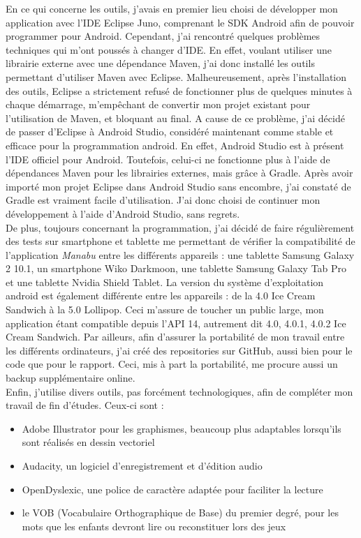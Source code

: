 En ce qui concerne les outils, j'avais en premier lieu choisi de développer mon application avec l'IDE Eclipse Juno, comprenant le SDK Android afin de pouvoir programmer pour Android. Cependant, j'ai rencontré quelques problèmes techniques qui m'ont poussés à changer d'IDE. En effet, voulant utiliser une librairie externe avec une dépendance Maven, j'ai donc installé les outils permettant d'utiliser Maven avec Eclipse. Malheureusement, après l'installation des outils, Eclipse a strictement refusé de fonctionner plus de quelques minutes à chaque démarrage, m'empêchant de convertir mon projet existant pour l'utilisation de Maven, et bloquant au final. A cause de ce problème, j'ai décidé de passer d'Eclipse à Android Studio, considéré maintenant comme stable et efficace pour la programmation android. En effet, Android Studio est à présent l'IDE officiel pour Android. Toutefois, celui-ci ne fonctionne plus à l'aide de dépendances Maven pour les librairies externes, mais grâce à Gradle. Après avoir importé mon projet Eclipse dans Android Studio sans encombre, j'ai constaté de Gradle est vraiment facile d'utilisation. J'ai donc choisi de continuer mon développement à l'aide d'Android Studio, sans regrets.\\

De plus, toujours concernant la programmation, j'ai décidé de faire régulièrement des tests sur smartphone et tablette me permettant de vérifier la compatibilité de l'application \textit{Manabu} entre les différents appareils : une tablette Samsung Galaxy 2 10.1, un smartphone Wiko Darkmoon, une tablette Samsung Galaxy Tab Pro et une tablette Nvidia Shield Tablet. La version du système d'exploitation android est également différente entre les appareils : de la 4.0 Ice Cream Sandwich à la 5.0 Lollipop. Ceci m'assure de toucher un public large, mon application étant compatible depuis l'API 14, autrement dit 4.0, 4.0.1, 4.0.2 Ice Cream Sandwich. Par ailleurs, afin d'assurer la portabilité de mon travail entre les différents ordinateurs, j'ai créé des repositories sur GitHub, aussi bien pour le code que pour le rapport. Ceci, mis à part la portabilité, me procure aussi un backup supplémentaire online.\\

Enfin, j'utilise divers outils, pas forcément technologiques, afin de compléter mon travail de fin d'études. Ceux-ci sont :
\begin{itemize}
\item Adobe Illustrator pour les graphismes, beaucoup plus adaptables lorsqu'ils sont réalisés en dessin vectoriel
\item Audacity, un logiciel d'enregistrement et d'édition audio
\item OpenDyslexic, une police de caractère adaptée pour faciliter la lecture
\item le VOB (Vocabulaire Orthographique de Base) du premier degré, pour les mots que les enfants devront lire ou reconstituer lors des jeux
\end{itemize} 



